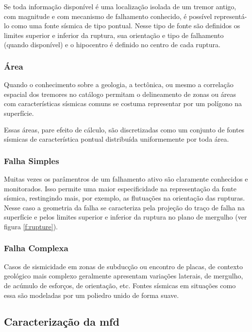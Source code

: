 Se toda informação disponível é uma localização isolada de um tremor antigo, com magnitude e com mecanismo de
falhamento conhecido, é possível representá-lo como uma fonte sísmica de tipo pontual. 
Nesse tipo de fonte são definidos os limites superior e inferior da ruptura, 
sua orientação e tipo de falhamento (quando disponível) 
e o hipocentro é definido no centro de cada ruptura.

\subsubsection{Área}
\label{sec:area_source}

Quando o conhecimento sobre a geologia, a tectônica, ou mesmo a correlação espacial dos tremores no catálogo permitam
o delineamento de zonas ou áreas com características sísmicas comuns se costuma representar por um polígono na
superfície.

Essas áreas, pare efeito de cálculo, são discretizadas como um conjunto de fontes sísmicas de
característica pontual distribuída uniformemente por toda área.

\subsubsection{Falha Simples}
\label{sec:simple_fault_source}

Muitas vezes os parâmentros de um falhamento ativo são claramente conhecidos e monitorados. Isso permite uma maior
especificidade na representação da fonte sísmica, restingindo mais, por exemplo, as flutuações na orientação das
rupturas.
Nesse caso a geometria da falha se caracteriza pela projeção do traço de falha na superfície e pelos limites superior e
inferior da ruptura no plano de mergulho (ver figura \ref{f:rupture}).


\subsubsection{Falha Complexa}
\label{sec:complex_fault_source}

Casos de sismicidade em zonas de subducção ou encontro de placas, de contexto geológico mais complexo 
geralmente apresentam variações laterais, de mergulho, de acúmulo de esforços, de orientação, etc. Fontes sísmicas em
situações como essa são modeladas por um poliedro unido de forma suave.


\subsection{Caracterização da \glsdesc*{mfd}}
\label{sec:psha_mfd}

